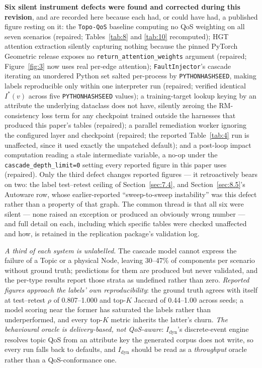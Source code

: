 \textbf{Six silent instrument defects were found and corrected during this revision}, and are
recorded here because each had, or could have had, a published figure resting on it: the
\texttt{Topo-QoS} baseline computing no QoS weighting on all seven scenarios (repaired;
Tables~\ref{tab:8} and \ref{tab:10} recomputed); HGT attention extraction silently capturing nothing
because the pinned PyTorch Geometric release exposes no \texttt{return\_attention\_weights} argument
(repaired; Figure~\ref{fig:3} now uses real per-edge attention); \texttt{FaultInjector}'s cascade
iterating an unordered Python set salted per-process by \texttt{PYTHONHASHSEED}, making labels
reproducible only within one interpreter run (repaired; verified identical \(I^*(v)\) across five
\texttt{PYTHONHASHSEED} values); a training-target lookup keying by an attribute the underlying
dataclass does not have, silently zeroing the RM-consistency loss term for any checkpoint trained
outside the harnesses that produced this paper's tables (repaired); a parallel remediation worker
ignoring the configured layer and checkpoint (repaired; the reported Table~\ref{tab:4} run is
unaffected, since it used exactly the unpatched default); and a post-loop impact computation reading
a stale intermediate variable, a no-op under the \texttt{cascade\_depth\_limit=0} setting every
reported figure in this paper uses (repaired). Only the third defect changes reported figures --- it
retroactively bears on two: the label test--retest ceiling of Section~\ref{sec:7.4}, and
Section~\ref{sec:8.5}'s Autoware row, whose earlier-reported ``sweep-to-sweep instability'' was this
defect rather than a property of that graph. The common thread is that all six were silent --- none
raised an exception or produced an obviously wrong number --- and full detail on each, including
which specific tables were checked unaffected and how, is retained in the replication package's
validation log.

\emph{A third of each system is unlabelled.} The cascade model cannot express the failure of a Topic
or a physical Node, leaving 30--47\% of components per scenario without ground truth; predictions for
them are produced but never validated, and the per-type results report those strata as undefined
rather than zero. \emph{Reported figures approach the labels' own reproducibility}: the ground truth
agrees with itself at test--retest \(\rho\) of 0.807--1.000 and top-\(K\) Jaccard of 0.44--1.00 across
seeds; a model scoring near the former has saturated the labels rather than underperformed, and every
top-\(K\) metric inherits the latter's churn. \emph{The behavioural oracle is delivery-based, not
QoS-aware}: \(I_{\text{dyn}}\)'s discrete-event engine resolves topic QoS from an attribute key the
generated corpus does not write, so every run falls back to defaults, and \(I_{\text{dyn}}\) should
be read as a \emph{throughput} oracle rather than a QoS-conformance one.

